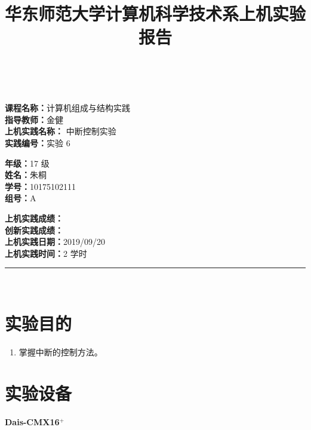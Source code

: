 \documentclass[a4paper,10pt,UTF8]{paper}
\title{华东师范大学计算机科学技术系上机实验报告}
\numberwithin{equation}{section}
\numberwithin{figure}{section}
\begin{document}
\pagestyle{fancy}
\lhead{}
\rhead{}
\makeatletter
\def\headrule{{\if@fancyplain\let\headrulewidth\plainheadrulewidth\fi%
	\color{gray}\hrule\@height 0.2pt\@width\headwidth}
	\vspace{6mm}}
\makeatother

\newcommand{\HRule}{\rule{\linewidth}{1mm}}
\newcommand{\dai}{\textbf{Dais-CMX16$^+$}}

{ \\ [0.8cm]
	
	\small{
		\begin{minipage}[t]{.32\linewidth}
			\textbf{课程名称：}计算机组成与结构实践\\
			\textbf{指导教师：}金健\\
			\textbf{上机实践名称：} 中断控制实验\\
			\textbf{实践编号：}实验 6
		\end{minipage}
		\begin{minipage}[t]{.32\linewidth}
			\textbf{年级：}17 级\\
			\textbf{姓名：}朱桐\\
			\textbf{学号：}10175102111\\
			\textbf{组号：}A
		\end{minipage} 
		\begin{minipage}[t]{.32\linewidth}
			\textbf{上机实践成绩：} \\
			\textbf{创新实践成绩：} \\
			\textbf{上机实践日期：}2019/09/20\\
			\textbf{上机实践时间：}2 学时\\
		\end{minipage}
	}
	\HRule \\[0.5cm]
}
\section{实验目的}

\begin{enumerate}
	\item 掌握中断的控制方法。
\end{enumerate}

\section{实验设备}

\dai
\end{document}

